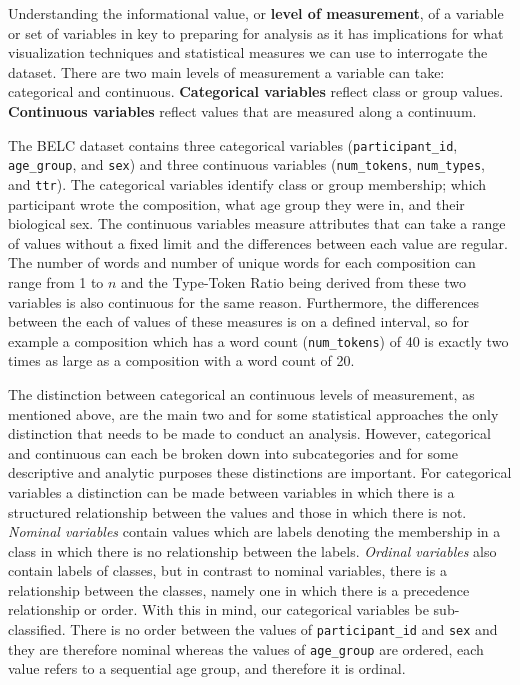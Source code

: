 \documentclass[
  letterpaper,
]{latex/krantz}
\begin{document}
Understanding the informational value, or \textbf{level of measurement},
of a variable or set of variables in key to preparing for analysis as it
has implications for what visualization techniques and statistical
measures we can use to interrogate the dataset. There are two main
levels of measurement a variable can take: categorical and continuous.
\textbf{Categorical variables} reflect class or group values.
\textbf{Continuous variables} reflect values that are measured along a
continuum.

The BELC dataset contains three categorical variables
(\texttt{participant\_id}, \texttt{age\_group}, and \texttt{sex}) and
three continuous variables (\texttt{num\_tokens}, \texttt{num\_types},
and \texttt{ttr}). The categorical variables identify class or group
membership; which participant wrote the composition, what age group they
were in, and their biological sex. The continuous variables measure
attributes that can take a range of values without a fixed limit and the
differences between each value are regular. The number of words and
number of unique words for each composition can range from 1 to \(n\)
and the Type-Token Ratio being derived from these two variables is also
continuous for the same reason. Furthermore, the differences between the
each of values of these measures is on a defined interval, so for
example a composition which has a word count (\texttt{num\_tokens}) of
40 is exactly two times as large as a composition with a word count of
20.

The distinction between categorical an continuous levels of measurement,
as mentioned above, are the main two and for some statistical approaches
the only distinction that needs to be made to conduct an analysis.
However, categorical and continuous can each be broken down into
subcategories and for some descriptive and analytic purposes these
distinctions are important. For categorical variables a distinction can
be made between variables in which there is a structured relationship
between the values and those in which there is not. \emph{Nominal
variables} contain values which are labels denoting the membership in a
class in which there is no relationship between the labels.
\emph{Ordinal variables} also contain labels of classes, but in contrast
to nominal variables, there is a relationship between the classes,
namely one in which there is a precedence relationship or order. With
this in mind, our categorical variables be sub-classified. There is no
order between the values of \texttt{participant\_id} and \texttt{sex}
and they are therefore nominal whereas the values of \texttt{age\_group}
are ordered, each value refers to a sequential age group, and therefore
it is ordinal.
\end{document}
